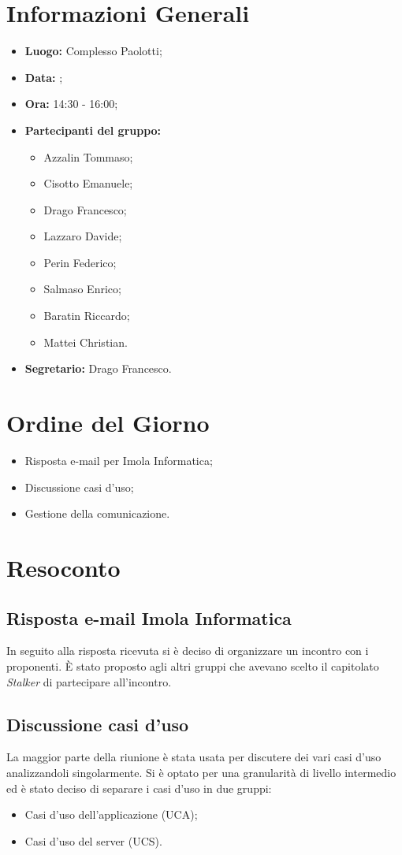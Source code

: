 \section{Informazioni Generali}
\begin{itemize}
\item \textbf{Luogo:} Complesso Paolotti;
\item \textbf{Data:} \Data;
\item \textbf{Ora:} 14:30 - 16:00;
\item \textbf{Partecipanti del gruppo:}
	\begin{itemize}
	\item Azzalin Tommaso; 
	\item Cisotto Emanuele; 
	\item Drago Francesco;
	\item Lazzaro Davide;
	\item Perin Federico;
	\item Salmaso Enrico;
	\item Baratin Riccardo;
	\item Mattei Christian.
	\end{itemize} 
\item \textbf{Segretario:} Drago Francesco.
\end{itemize}


\section{Ordine del Giorno}
\begin{itemize}
\item Risposta e-mail per Imola Informatica;
\item Discussione casi d'uso;
\item Gestione della comunicazione.
\end{itemize}

\section{Resoconto}
\subsection{Risposta e-mail Imola Informatica}
In seguito alla risposta ricevuta si è deciso di organizzare un incontro con i proponenti.
È stato proposto agli altri gruppi che avevano scelto il capitolato \textit{Stalker} di partecipare all'incontro. 

\subsection{Discussione casi d'uso}
La maggior parte della riunione è stata usata per discutere dei vari casi d'uso analizzandoli singolarmente.
Si è optato per una granularità di livello intermedio ed è stato deciso di separare i casi d'uso in due gruppi:
\begin{itemize}
\item Casi d'uso dell'applicazione (UCA);
\item Casi d'uso del server (UCS).
\end{itemize}


